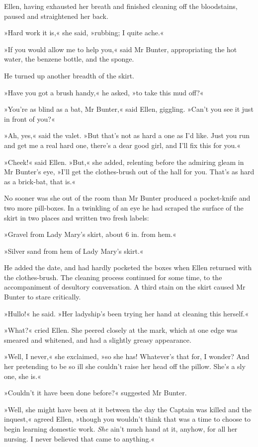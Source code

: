Ellen, having exhausted her breath and finished cleaning off the bloodstains, paused and straightened her back.

»Hard work it is,« she said, »rubbing; I quite ache.«

»If you would allow me to help you,« said Mr Bunter, appropriating the hot water, the benzene bottle, and the sponge.

He turned up another breadth of the skirt.

»Have you got a brush handy,« he asked, »to take this mud off?«

»You're as blind as a bat, Mr Bunter,« said Ellen, giggling. »Can't you see it just in front of you?«

»Ah, yes,« said the valet. »But that's not as hard a one as I'd like.  Just you run and get me a real hard one, there's a dear good girl, and I'll fix this for you.«

»Cheek!« said Ellen. »But,« she added, relenting before the admiring gleam in Mr Bunter's eye, »I'll get the clothes-brush out of the hall for you. That's as hard as a brick-bat, that is.«

No sooner was she out of the room than Mr Bunter produced a pocket-knife and two more pill-boxes. In a twinkling of an eye he had scraped the surface of the skirt in two places and written two fresh labels:

»Gravel from Lady Mary's skirt, about 6 in. from hem.«

»Silver sand from hem of Lady Mary's skirt.«

He added the date, and had hardly pocketed the boxes when Ellen returned with the clothes-brush. The cleaning process continued for some time, to the accompaniment of desultory conversation. A third stain on the skirt caused Mr Bunter to stare critically.

»Hullo!« he said. »Her ladyship's been trying her hand at cleaning this herself.«

»What?« cried Ellen. She peered closely at the mark, which at one edge was smeared and whitened, and had a slightly greasy appearance.

»Well, I never,« she exclaimed, »so she has! Whatever's that for, I wonder? And her pretending to be so ill she couldn't raise her head off the pillow. She's a sly one, she is.«

»Couldn't it have been done before?« suggested Mr Bunter.

»Well, she might have been at it between the day the Captain was killed and the inquest,« agreed Ellen, »though you wouldn't think that was a time to choose to begin learning domestic work. \textit{She} ain't much hand at it, anyhow, for all her nursing. I never believed that came to anything.«


